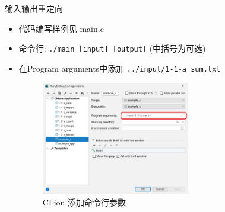 \begin{frame}[fragile]{输入输出重定向}
\begin{itemize}[<+- | alert@+>]
\item 代码编写样例见 main.c
\item 命令行: \texttt{./main [input] [output]}  (中括号为可选)
\item 在Program arguments中添加 \texttt{../input/1-1-a\_sum.txt}
\emptyline\begin{figure}[ht!]
\centering
\includegraphics[width=65mm]{figs/clion_cmdargs.png}
\caption{CLion 添加命令行参数}
\end{figure}
\end{itemize}
\end{frame}
